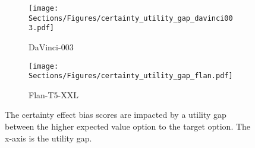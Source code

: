 \begin{figure}[t!]
\centering
\begin{subfigure}[th!]{0.5\textwidth}
\centering
    \texttt{[image: Sections/Figures/certainty\_utility\_gap\_davinci003.pdf]}
    \caption{DaVinci-003}
    \label{fig:certainty_utility_davinci003}
\end{subfigure}%
\hfill
\begin{subfigure}[th!]{0.5\textwidth}
\centering
    \texttt{[image: Sections/Figures/certainty\_utility\_gap\_flan.pdf]}
    \caption{Flan-T5-XXL}
    \label{fig:certainty_utility_flan}
\end{subfigure}
\caption{The certainty effect bias scores are impacted by a utility gap between the higher expected value option to the target option. The x-axis is the utility gap.}
\label{fig:certainty_utility_gap}
\end{figure}